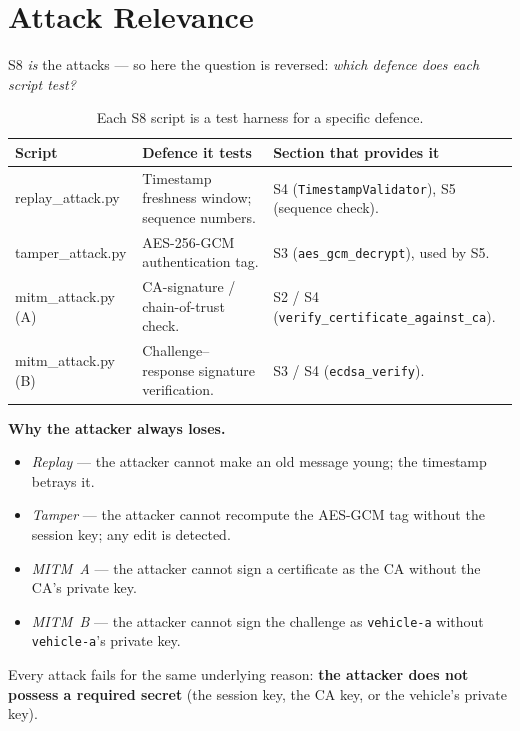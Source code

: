 \documentclass[11pt,a4paper]{article}
\begin{document}
\section{Attack Relevance}

S8 \emph{is} the attacks --- so here the question is reversed: \emph{which
defence does each script test?}

\begin{table}[h]
\centering
\small
\begin{tabular}{@{}p{3.0cm} p{4.6cm} p{4.9cm}@{}}
\toprule
\textbf{Script} & \textbf{Defence it tests} & \textbf{Section that provides it}\\
\midrule
replay\_attack.py & Timestamp freshness window; sequence numbers. & S4
(\texttt{TimestampValidator}), S5 (sequence check).\\
tamper\_attack.py & AES-256-GCM authentication tag. & S3 (\texttt{aes\_gcm\_decrypt}),
used by S5.\\
mitm\_attack.py (A) & CA-signature / chain-of-trust check. & S2 / S4
(\texttt{verify\_certificate\_against\_ca}).\\
mitm\_attack.py (B) & Challenge--response signature verification. & S3 / S4
(\texttt{ecdsa\_verify}).\\
\bottomrule
\end{tabular}
\caption{Each S8 script is a test harness for a specific defence.}
\end{table}

\noindent\textbf{Why the attacker always loses.}
\begin{itemize}
  \item \emph{Replay} --- the attacker cannot make an old message young; the
        timestamp betrays it.
  \item \emph{Tamper} --- the attacker cannot recompute the AES-GCM tag without
        the session key; any edit is detected.
  \item \emph{MITM~A} --- the attacker cannot sign a certificate as the CA
        without the CA's private key.
  \item \emph{MITM~B} --- the attacker cannot sign the challenge as
        \texttt{vehicle-a} without \texttt{vehicle-a}'s private key.
\end{itemize}
Every attack fails for the same underlying reason: \textbf{the attacker does not
possess a required secret} (the session key, the CA key, or the vehicle's
private key).
\end{document}
